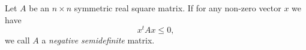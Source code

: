 \documentclass[12pt]{article}
\begin{document}
Let $A$ be an $n\times n$ symmetric real square matrix. If for any non-zero vector $x$ we have
$$x^t Ax\leq0,$$
we call $A$ a \emph{negative semidefinite} matrix.
\end{document}

